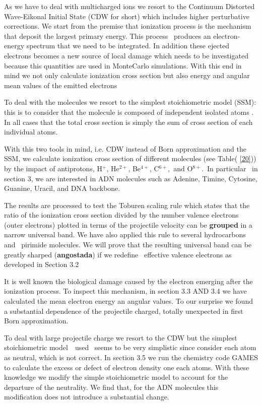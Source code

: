\documentclass[preprint,showpacs,pra]{revtex4}
\begin{document}
As we have to deal with multicharged ions we resort to the Continuum
Distorted Wave-Eikonal Initial State (CDW for short) which includes higher
perturbative corrections. We start from the premise that ionization process
is the mechanism that deposit the largest primary energy. This process \
produces an electron-energy spectrum that we need to be integrated. In
addition these ejected electrons becomes a new source of local damage which
needs to be investigated because this quantities are used in MonteCarlo
simulations. With this end in mind we not only calculate ionization cross
section but also energy and angular mean values of the emitted electrons

To deal with the molecules we resort to the simplest stoichiometric model
(SSM): this is to consider that the molecule is composed of independent
isolated atoms . In all cases that the total cross section is simply the sum
of cross section of each individual atoms.

With this two tools in mind, i.e. CDW instead of Born approximation and the
SSM, we calculate ionization cross section of different molecules (see Table(%
\ref{20})) by the impact of antiprotons, H$^{+}$, He$^{2+}$, Be$^{4+}$, C$%
^{6+}$,\ and O$^{8+}.$\ In particular \ in section 3, we are interested in
ADN molecules such as Adenine, Timine, Cytosine, Guanine, Uracil, and DNA
backbone.

The results are processed to test the Toburen scaling rule which states that
the ratio of the ionization cross section divided by the number valence
electrons (outer electrons) plotted in terms of the projectile velocity can
be \textbf{grouped} in a narrow universal band. We have also applied this
rule to several hydrocarbons and \ pirimide molecules. We will prove that
the resulting universal band can be greatly sharped (\textbf{angostada}) if
we redefine \ effective valence electrons as developed in Section 3.2

It is well known the biological damage caused by the electron emerging after
the ionization process. To inspect this mechanism, in section 3.3 AND 3.4 we
have calculated the mean electron energy an angular values. To our surprise
we found a substantial dependence of the projectile charged, totally
unexpected in first Born approximation.

To deal with large projectile charge we resort to the CDW but the simplest
stoichiometric model~\ used \ seems to be very simplistic since consider
each atom as neutral, which is not correct. In section 3.5 we run the
chemistry code GAMES to calculate the excess or defect of electron density
one each atoms. With these knowledge we modify the simple stoichiometric
model to account for the departure of the neutrality. We find that, for the
ADN molecules this modification does not introduce a substantial change.
\end{document}
